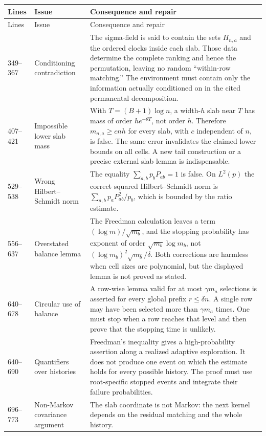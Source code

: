 \documentclass[11pt]{article}
\newcommand{\1}{\mathbf 1}
\theoremstyle{remark}
\begin{document}
\renewcommand{\arraystretch}{1.15}
\begin{longtable}{p{}p{}p{}}
\toprule
Lines & Issue & Consequence and repair \\
\midrule
\endfirsthead
\toprule
Lines & Issue & Consequence and repair \\
\midrule
\endhead
349--367 & Conditioning contradiction & The sigma-field is said to contain the
sets $H_{n,a}$ and the ordered clocks inside each slab.  Those data determine
the complete ranking and hence the permutation, leaving no random
``within-row matching.''  The environment must contain only the information
actually conditioned on in the cited permanental decomposition. \\
407--421 & Impossible lower slab mass & With $T=(B+1)\log n$, a width-$h$ slab
near $T$ has mass of order $h e^{-\theta T}$, not order $h$.  Therefore
$m_{n,a}\ge cnh$ for every slab, with $c$ independent of $n$, is false.  The
same error invalidates the claimed lower bounds on all cells.  A new tail
construction or a precise external slab lemma is indispensable. \\
529--538 & Wrong Hilbert--Schmidt norm & The equality
$\sum_{a,b}p_bP_{ab}=1$ is false.  On $L^2(p)$ the correct squared
Hilbert--Schmidt norm is
$\sum_{a,b}p_aP_{ab}^2/p_b$, which is bounded by the ratio estimate. \\
556--637 & Overstated balance lemma & The Freedman calculation leaves a term
$(\log m)/\sqrt{m_b}$, and the stopping probability has exponent of order
$\sqrt{m_b}\log m_b$, not
$(\log m_b)^2\sqrt{m_b}/\delta$.  Both corrections are harmless when cell
sizes are polynomial, but the displayed lemma is not proved as stated. \\
640--678 & Circular use of balance & A row-wise lemma valid for at most
$\gamma m_a$ selections is asserted for every global prefix $r\le\delta n$.
A single row may have been selected more than $\gamma m_a$ times.  One must
stop when a row reaches that level and then prove that the stopping time is
unlikely. \\
640--690 & Quantifiers over histories & Freedman's inequality gives a
high-probability assertion along a realized adaptive exploration.  It does not
produce one event on which the estimate holds for every possible history.
The proof must use root-specific stopped events and integrate their failure
probabilities. \\
696--773 & Non-Markov covariance argument & The slab coordinate is not Markov:
the next kernel depends on the residual matching and the whole history.

\end{longtable}
\end{document}
